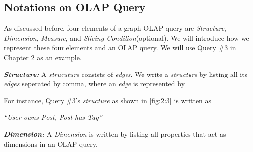 %
%
%
%
%
%
%

\subsection{Notations on OLAP Query}

As discussed before, four elements of a graph OLAP query are \textit{Structure}, \textit{Dimension}, \textit{Measure}, and \textit{Slicing Condition}(optional). We will introduce how we represent these four elements and an OLAP query. We will use Query \#3 in Chapter 2 as an example.

\textbf{\textit{Structure:}} A \textit{strucuture} consists of \textit{edges}. We write a \textit{structure} by listing all its \textit{edges} seperated by comma, where an \textit{edge} is represented by 


For instance, Query \#3's \textit{structure} as shown in \ref{fig:2:3} is written as 

\textit{``User-owns-Post, Post-has-Tag''}



\textbf{\textit{Dimension:}} A
\textit{Dimension} is written by listing all properties that act as dimensions in an OLAP query.

